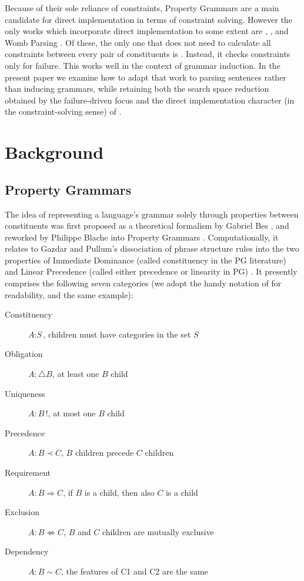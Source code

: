 \documentclass{llncs}
\newcommand{\constituency}[2]{\textit{#1} : \textit{#2}}
\newcommand{\obligation}[2]{\textit{#1} : \triangle \textit{#2}}
\newcommand{\uniqueness}[2]{\textit{#1} : \textit{#2}\,!}
\newcommand{\precedence}[3]{\textit{#1} : \textit{#2} \prec \textit{#3}}
\newcommand{\requirement}[3]{\textit{#1} : \textit{#2} \Rightarrow \textit{#3}}
\newcommand{\exclusion}[3]{\textit{#1} : \textit{#2} \not\Leftrightarrow \textit{#3}}
\newcommand{\dependency}[3]{\textit{#1} : \textit{#2} \sim \textit{#3}}
\begin{document}
Because of their sole reliance of constraints, Property Grammars are a main candidate for direct implementation in terms of constraint solving. However the only works which incorporate direct implementation to some extent are \cite{BM00}, \cite{DB04}, \cite{logcom13DuchierEtAl} and Womb Parsing \cite{DM12}.  Of these, the only one that does not need to  calculate all constraints between every pair of constituents is \cite{DM12}. Instead, it checks  constraints  only for failure. This works well in the context of  grammar induction. In the present paper we examine how to adapt that work to  parsing sentences rather than inducing grammars, while retaining both the search space reduction obtained by the failure-driven focus  and the direct implementation character  (in the constraint-solving sense)  of \cite{DM12}. 

\section{Background}

\subsection{Property Grammars}

The idea of representing a language's grammar solely through properties between constituents was first proposed as a theoretical formalism by Gabriel Bes \cite{Bes}, and reworked by Philippe Blache into Property Grammars  \cite{Blache,BB01}. Computationally, it relates to Gazdar and Pullum's dissociation of phrase structure rules into the two properties of Immediate Dominance (called constituency in the PG literature) and Linear Precedence (called either precedence or linearity in PG) \cite{IDLP}.   It presently comprises the following seven categories (we adopt the handy notation of  \cite{logcom13DuchierEtAl} for readability, and the same example):

\begin{description}
  \item[Constituency] $\constituency{A}{S}$, children must have categories in the set $S$
  \item[Obligation] $\obligation{A}{B}$, at least one $B$ child
  \item[Uniqueness] $\uniqueness{A}{B}$, at most one $B$ child
  \item[Precedence] $\precedence{A}{B}{C}$, $B$ children precede $C$ children
  \item[Requirement]$\requirement{A}{B}{C}$, if $B$ is a child, then also $C$ is a child
  \item[Exclusion]$\exclusion{A}{B}{C}$, $B$ and $C$ children are mutually exclusive
  \item[Dependency]$\dependency{A}{B}{C}$, the features of C1 and C2 are the same
\end{description}
\end{document}
